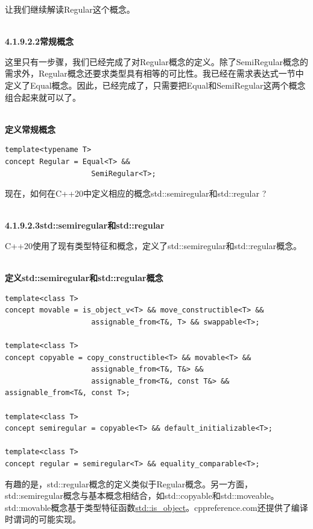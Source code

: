 让我们继续解读Regular这个概念。

\hspace*{\fill} \\ %
\noindent
\textbf{4.1.9.2.2\hspace{0.2cm}常规概念}

这里只有一步骤，我们已经完成了对Regular概念的定义。除了SemiRegular概念的需求外，Regular概念还要求类型具有相等的可比性。我已经在需求表达式一节中定义了Equal概念。因此，已经完成了，只需要把Equal和SemiRegular这两个概念组合起来就可以了。

\hspace*{\fill} \\ %
\noindent
\textbf{定义常规概念}
\begin{lstlisting}[style=styleCXX]
template<typename T>
concept Regular = Equal<T> &&
					SemiRegular<T>;
\end{lstlisting}

现在，如何在C++20中定义相应的概念std::semiregular和std::regular ?

\hspace*{\fill} \\ %
\noindent
\textbf{4.1.9.2.3\hspace{0.2cm}std::semiregular和std::regular}

C++20使用了现有类型特征和概念，定义了std::semiregular和std::regular概念。

\hspace*{\fill} \\ %
\noindent
\textbf{定义std::semiregular和std::regular概念}
\begin{lstlisting}[style=styleCXX]
template<class T>
concept movable = is_object_v<T> && move_constructible<T> &&
					assignable_from<T&, T> && swappable<T>;

template<class T>
concept copyable = copy_constructible<T> && movable<T> &&
					assignable_from<T&, T&> &&
					assignable_from<T&, const T&> && assignable_from<T&, const T>;

template<class T>
concept semiregular = copyable<T> && default_initializable<T>;

template<class T>
concept regular = semiregular<T> && equality_comparable<T>;
\end{lstlisting}

有趣的是，std::regular概念的定义类似于Regular概念。另一方面，std::semiregular概念与基本概念相结合，如std::copyable和std::moveable。std::movable概念基于类型特征函数\href{https://en.cppreference.com/w/cpp/types/is_object}{std::is\_object}。cppreference.com还提供了编译时谓词的可能实现。

